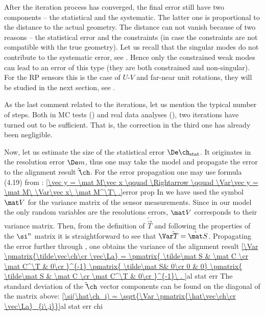 
After the iteration process has converged, the final error still have two components -- the statistical and the systematic. The latter one is proportional to the distance to the actual geometry. The distance can not vanish because of two reasons -- the statistical error and the constraints (in case the constraints are not compatible with the true geometry). Let us recall that the singular modes do not contribute to the systematic error, see . Hence only the constrained weak modes can lead to an error of this type (they are both constrained and non-singular). For the RP sensors this is the case of $U$-$V$ and far-near unit rotations, they will be studied in the next section, see .

As the last comment related to the iterations, let us mention the typical number of steps. Both in MC tests () and real data analyses (), two iterations have turned out to be sufficient. That is, the correction in the third one has already been negligible.

Now, let us estimate the size of the statistical error $\De\ch_{\rm stat}$. It originates in the resolution error $\De m$, thus one may take the model  and propagate the error to the alignment result $\hat\vec\ch$. For the error propagation one may use formula (4.19) from :
\eqref{\vec y = \mat M\vec x \qquad \Rightarrow \qquad \Var\vec y = \mat M\ \Var\vec x\ \mat M^\T\ .}{error prop}
In  we have used the symbol $\mat V$ for the variance matrix of the sensor measurements. Since in our model the only random variables are the resolutions errors, $\mat V$ corresponds to their variance matrix. Then, from the definition of $\tilde\vec T$  and following the properties of the $\si^n$ matrix  it is straightforward to see that $\Var \tilde\vec T = \tilde\mat S$. Propagating the error further through , one obtains the variance of the alignment result
\eqref{\Var \pmatrix{\tilde\vec\ch\cr \vec\La} = 
	\pmatrix{
		\tilde\mat S & \mat C \cr
		\mat C^\T & 0\cr
	}^{-1}
	\pmatrix{
		\tilde\mat S& 0\cr
		0 & 0}
	\pmatrix{
		\tilde\mat S & \mat C \cr
		\mat C^\T & 0\cr
	}^{-1}\ .
}{al stat err}
The standard deviation of the $\hat\vec\ch$ vector components can be found on the diagonal of the matrix above:
\eqref{\si(\hat\ch_i) = \sqrt{\Var \pmatrix{\hat\vec\ch\cr  \vec\La}_{i\,i}}}{al stat err chi}



